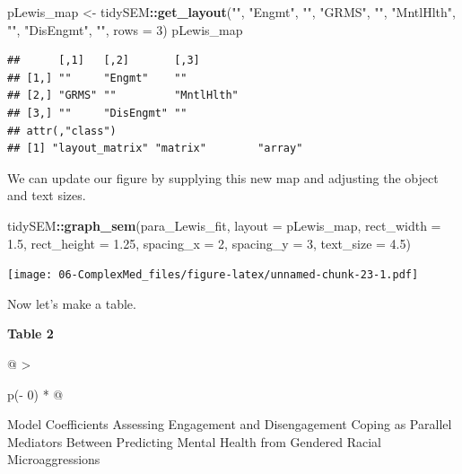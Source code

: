 \documentclass[
  11pt,
]{book}
\newenvironment{Shaded}{\begin{snugshade}}{\end{snugshade}}
\newcommand{\AttributeTok}[1]{\textcolor[rgb]{0.27,0.27,0.27}{#1}}
\newcommand{\DecValTok}[1]{\textcolor[rgb]{0.06,0.06,0.06}{#1}}
\newcommand{\FloatTok}[1]{\textcolor[rgb]{0.06,0.06,0.06}{#1}}
\newcommand{\FunctionTok}[1]{\textcolor[rgb]{0.27,0.27,0.27}{\textbf{#1}}}
\newcommand{\NormalTok}[1]{#1}
\newcommand{\OtherTok}[1]{\textcolor[rgb]{0.37,0.37,0.37}{#1}}
\newcommand{\SpecialCharTok}[1]{\textcolor[rgb]{0.43,0.43,0.43}{\textbf{#1}}}
\newcommand{\StringTok}[1]{\textcolor[rgb]{0.5,0.5,0.5}{#1}}
\begin{document}
\begin{Shaded}
\begin{Highlighting}[]
\NormalTok{pLewis\_map }\OtherTok{\textless{}{-}}\NormalTok{ tidySEM}\SpecialCharTok{::}\FunctionTok{get\_layout}\NormalTok{(}\StringTok{""}\NormalTok{, }\StringTok{"Engmt"}\NormalTok{, }\StringTok{""}\NormalTok{, }\StringTok{"GRMS"}\NormalTok{, }\StringTok{""}\NormalTok{, }\StringTok{"MntlHlth"}\NormalTok{,}
    \StringTok{""}\NormalTok{, }\StringTok{"DisEngmt"}\NormalTok{, }\StringTok{""}\NormalTok{, }\AttributeTok{rows =} \DecValTok{3}\NormalTok{)}
\NormalTok{pLewis\_map}
\end{Highlighting}
\end{Shaded}

\begin{verbatim}
##      [,1]   [,2]       [,3]      
## [1,] ""     "Engmt"    ""        
## [2,] "GRMS" ""         "MntlHlth"
## [3,] ""     "DisEngmt" ""        
## attr(,"class")
## [1] "layout_matrix" "matrix"        "array"
\end{verbatim}

We can update our figure by supplying this new map and adjusting the object and text sizes.

\begin{Shaded}
\begin{Highlighting}[]
\NormalTok{tidySEM}\SpecialCharTok{::}\FunctionTok{graph\_sem}\NormalTok{(para\_Lewis\_fit, }\AttributeTok{layout =}\NormalTok{ pLewis\_map, }\AttributeTok{rect\_width =} \FloatTok{1.5}\NormalTok{,}
    \AttributeTok{rect\_height =} \FloatTok{1.25}\NormalTok{, }\AttributeTok{spacing\_x =} \DecValTok{2}\NormalTok{, }\AttributeTok{spacing\_y =} \DecValTok{3}\NormalTok{, }\AttributeTok{text\_size =} \FloatTok{4.5}\NormalTok{)}
\end{Highlighting}
\end{Shaded}

\texttt{[image: 06-ComplexMed\_files/figure-latex/unnamed-chunk-23-1.pdf]}

Now let's make a table.

\textbf{Table 2 }

\begin{longtable}[]{@{}
  >{\raggedright\arraybackslash}p{(\columnwidth - 0\tabcolsep) * }@{}}
\toprule\noalign{}
\begin{minipage}[b]{\linewidth}\raggedright
Model Coefficients Assessing Engagement and Disengagement Coping as Parallel Mediators Between Predicting Mental Health from Gendered Racial Microaggressions
\end{minipage} \\
\midrule\noalign{}
\endhead
\bottomrule\noalign{}
\endlastfoot
\end{longtable}
\end{document}
